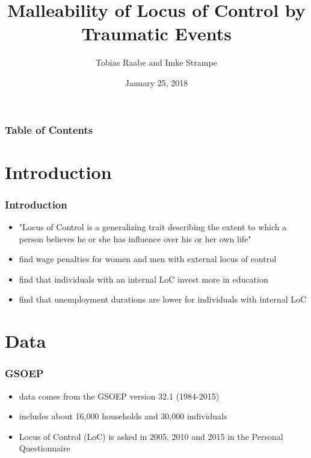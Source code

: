\documentclass{beamer}
\date{January 25, 2018}
\author[Raabe and Strampe]{Tobias Raabe and Imke Strampe}
\title{Malleability of Locus of Control by Traumatic Events}
\institute[Uni Bonn]{University of Bonn}
\begin{document}
\begin{frame}[t]

\titlepage

\end{frame}

\begin{frame}[t]\frametitle{Table of Contents}

\tableofcontents

\end{frame}

\section{Introduction} %
\label{sec:introduction}

\begin{frame}[t]\frametitle{Introduction}

\begin{itemize}[<+->]
    \item "Locus of Control is a generalizing trait describing the extent to which a person believes he or she has influence over his or her own life" \citep{specht2013}
    \item \citet{heineck2010} find wage penalties for women and men with external locus of control
    \item \citet{piatek2010} find that individuals with an internal LoC invest more in education
    \item \citet{gallo2003} find that unemployment durations are lower for individuals with internal LoC
\end{itemize}


\end{frame}


\section{Data} %
\label{sec:data}

\begin{frame}[t]\frametitle{GSOEP}

\begin{itemize}
    \item data comes from the GSOEP version 32.1 (1984-2015)
    \item includes about 16,000 households and 30,000 individuals
    \item Locus of Control (LoC) is asked in 2005, 2010 and 2015 in the Personal
  Questionnaire
\end{itemize}


\end{frame}
\end{document}
